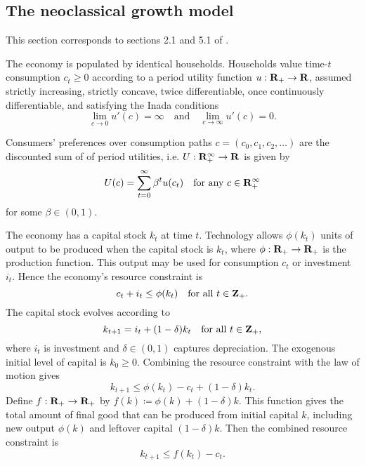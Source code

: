 \documentclass[11pt,letterpaper,reqno,oneside]{article}
\begin{document}
\subsection{The neoclassical growth model}
\label{sec:21Sep2015:neoclassical_growth_model}

This section corresponds to sections 2.1 and 5.1 of \textcite{StokeyLucasPrescott1989}.

The economy is populated by identical households. Households value time-$t$ consumption $c_t \geq 0$ according to a period utility function $u : \mathbf{R}_+ \to \mathbf{R}$, assumed strictly increasing, strictly concave, twice differentiable, once continuously differentiable, and satisfying the Inada conditions
%
\begin{equation*}
	\lim_{c \to 0} u'(c) = \infty
	\quad\text{and}\quad
	\lim_{c \to \infty} u'(c) = 0 .
\end{equation*}

Consumers' preferences over consumption paths $c = (c_0,c_1,c_2,\dots)$ are the discounted sum of of period utilities, i.e. $U : \mathbf{R}_+^\infty \to \mathbf{R}$ is given by
%
\begin{equation*}
	U(c) = \sum_{t=0}^\infty \beta^t u(c_t) 
	\quad\text{for any $c \in \mathbf{R}_+^\infty$} 
\end{equation*}
%
for some $\beta \in (0,1)$.

The economy has a capital stock $k_t$ at time $t$. Technology allows $\phi(k_t)$ units of output to be produced when the capital stock is $k_t$, where $\phi : \mathbf{R}_+ \to \mathbf{R}_+$ is the production function. This output may be used for consumption $c_t$ or investment $i_t$. Hence the economy's resource constraint is
%
\begin{equation*}
	c_t + i_t \leq \phi(k_t)
	\quad\text{for all $t \in \mathbf{Z}_+$} .
\end{equation*}
%
The capital stock evolves according to
%
\begin{equation*}
	k_{t+1} = i_t + (1-\delta) k_t
	\quad\text{for all $t \in \mathbf{Z}_+$},
\end{equation*}
%
where $i_t$ is investment and $\delta \in (0,1)$ captures depreciation. The exogenous initial level of capital is $k_0 \geq 0$. Combining the resource constraint with the law of motion gives
%
\begin{equation*}
	k_{t+1} \leq \phi(k_t) - c_t + (1-\delta) k_t .
\end{equation*}
%
Define $f : \mathbf{R}_+ \to \mathbf{R}_+$ by $f(k) \coloneqq \phi(k) + (1-\delta)k$. This function gives the total amount of final good that can be produced from initial capital $k$, including new output $\phi(k)$ and leftover capital $(1-\delta)k$. Then the combined resource constraint is
%
\begin{equation*}
	k_{t+1} \leq f(k_t) - c_t .
\end{equation*}
\end{document}
